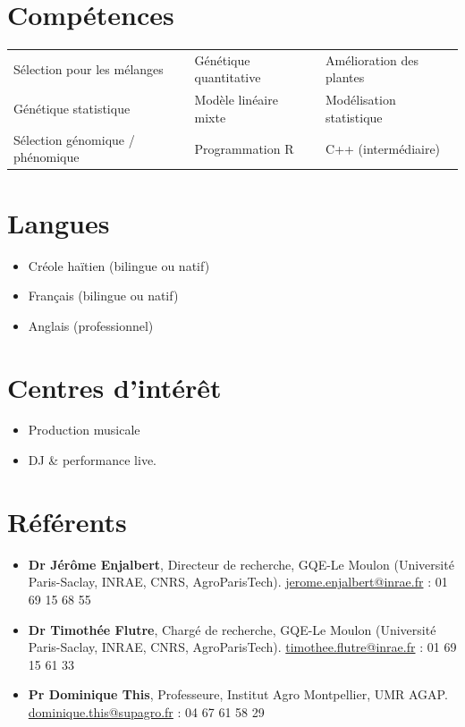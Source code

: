\documentclass[10pt,a4paper]{article}
\begin{document}
\section{Compétences}
{\small
\begin{tabularx}{\textwidth}{@{}>{\raggedright\arraybackslash}X >{\raggedright\arraybackslash}X >{\raggedright\arraybackslash}X@{}}
Sélection pour les mélanges & Génétique quantitative & Amélioration des plantes\\[2pt]
Génétique statistique & Modèle linéaire mixte & Modélisation statistique\\[2pt]
Sélection génomique / phénomique & Programmation R & C++ (intermédiaire)\\
\end{tabularx}}

\section{Langues}
\begin{itemize}[label=\textbullet]
  \item Créole haïtien (bilingue ou natif)
  \item Français (bilingue ou natif)
  \item Anglais (professionnel)
\end{itemize}

\newpage
\section{Centres d'intérêt}
\begin{itemize}[label=\textbullet, itemsep=6pt]
\item Production musicale  \item DJ \& performance live.
\end{itemize}


\section{Référents}
\begin{itemize}[label=\textbullet, itemsep=6pt]
  \item \textbf{Dr Jérôme Enjalbert},  Directeur de recherche, GQE-Le Moulon (Université Paris-Saclay, INRAE, CNRS, AgroParisTech). \href{mailto:jerome.enjalbert@inrae.fr}{jerome.enjalbert@inrae.fr} : 01 69 15 68 55
  \item \textbf{Dr Timothée Flutre}, Chargé de recherche, GQE-Le Moulon (Université Paris-Saclay, INRAE, CNRS, AgroParisTech). \href{mailto:timothee.flutre@inrae.fr}{timothee.flutre@inrae.fr} : 01 69 15 61 33
  \item \textbf{Pr Dominique This}, Professeure, Institut Agro Montpellier, UMR AGAP. \href{mailto:dominique.this@supagro.fr}{dominique.this@supagro.fr} : 04 67 61 58 29
\end{itemize}
\end{document}

